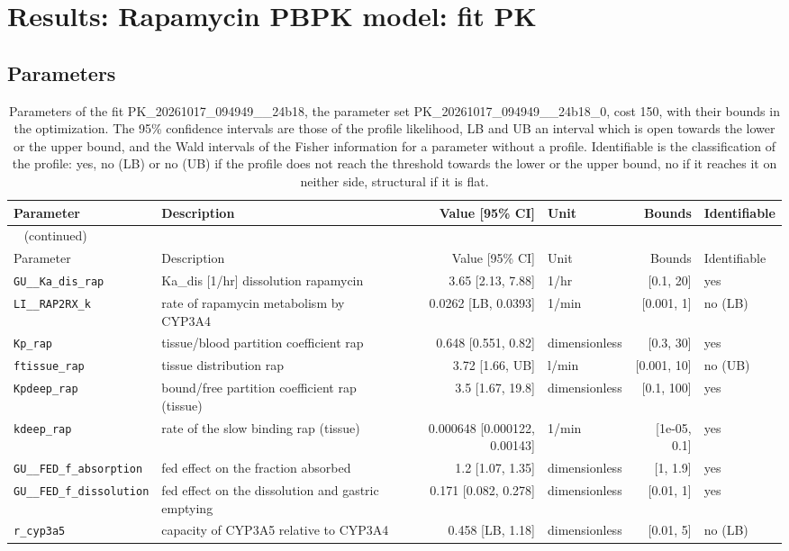 \documentclass{article}
\begin{document}
\section{Results: Rapamycin PBPK model: fit PK}

\subsection{Parameters}

\begin{longtable}{llrlrl}
\caption{Parameters of the fit PK\_20261017\_094949\_\_24b18, the parameter set PK\_20261017\_094949\_\_24b18\_0, cost 150, with their bounds in the optimization. The 95\% confidence intervals are those of the profile likelihood, LB and UB an interval which is open towards the lower or the upper bound, and the Wald intervals of the Fisher information for a parameter without a profile. Identifiable is the classification of the profile: yes, no (LB) or no (UB) if the profile does not reach the threshold towards the lower or the upper bound, no if it reaches it on neither side, structural if it is flat.}\label{tab:parameters:PK_20261017_094949__24b18} \\
\toprule
Parameter & Description & Value [95\% CI] & Unit & Bounds & Identifiable \\
\midrule
\endfirsthead
\multicolumn{6}{l}{\small\tablename~\thetable{} (continued)} \\
\toprule
Parameter & Description & Value [95\% CI] & Unit & Bounds & Identifiable \\
\midrule
\endhead
\bottomrule
\endlastfoot
\texttt{GU\_\_Ka\_dis\_rap} & Ka\_dis [1/hr] dissolution rapamycin & 3.65 [2.13, 7.88] & 1/hr & [0.1, 20] & yes \\
\texttt{LI\_\_RAP2RX\_k} & rate of rapamycin metabolism by CYP3A4 & 0.0262 [LB, 0.0393] & 1/min & [0.001, 1] & no (LB) \\
\texttt{Kp\_rap} & tissue/blood partition coefficient rap & 0.648 [0.551, 0.82] & dimensionless & [0.3, 30] & yes \\
\texttt{ftissue\_rap} & tissue distribution rap & 3.72 [1.66, UB] & l/min & [0.001, 10] & no (UB) \\
\texttt{Kpdeep\_rap} & bound/free partition coefficient rap (tissue) & 3.5 [1.67, 19.8] & dimensionless & [0.1, 100] & yes \\
\texttt{kdeep\_rap} & rate of the slow binding rap (tissue) & 0.000648 [0.000122, 0.00143] & 1/min & [1e-05, 0.1] & yes \\
\texttt{GU\_\_FED\_f\_absorption} & fed effect on the fraction absorbed & 1.2 [1.07, 1.35] & dimensionless & [1, 1.9] & yes \\
\texttt{GU\_\_FED\_f\_dissolution} & fed effect on the dissolution and gastric emptying & 0.171 [0.082, 0.278] & dimensionless & [0.01, 1] & yes \\
\texttt{r\_cyp3a5} & capacity of CYP3A5 relative to CYP3A4 & 0.458 [LB, 1.18] & dimensionless & [0.01, 5] & no (LB) \\
\end{longtable}
\end{document}
